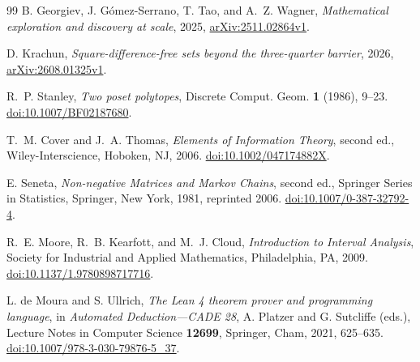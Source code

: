 \documentclass[11pt]{article}
\theoremstyle{definition}
\theoremstyle{remark}
\begin{document}
\begin{thebibliography}{99}
B. Georgiev, J. G\'omez-Serrano, T. Tao, and A.~Z. Wagner,
\emph{Mathematical exploration and discovery at scale},
2025, \href{https://arxiv.org/abs/2511.02864v1}{arXiv:2511.02864v1}.

D. Krachun,
\emph{Square-difference-free sets beyond the three-quarter barrier},
2026, \href{https://arxiv.org/abs/2608.01325v1}{arXiv:2608.01325v1}.

R.~P. Stanley,
\emph{Two poset polytopes},
Discrete Comput. Geom. \textbf{1} (1986), 9--23.
\href{https://doi.org/10.1007/BF02187680}{doi:10.1007/BF02187680}.


T.~M. Cover and J.~A. Thomas,
\emph{Elements of Information Theory}, second ed.,
Wiley-Interscience, Hoboken, NJ, 2006.
\href{https://doi.org/10.1002/047174882X}{doi:10.1002/047174882X}.


E. Seneta,
\emph{Non-negative Matrices and Markov Chains}, second ed.,
Springer Series in Statistics, Springer, New York, 1981,
reprinted 2006.
\href{https://doi.org/10.1007/0-387-32792-4}{doi:10.1007/0-387-32792-4}.


R.~E. Moore, R.~B. Kearfott, and M.~J. Cloud,
\emph{Introduction to Interval Analysis},
Society for Industrial and Applied Mathematics, Philadelphia, PA, 2009.
\href{https://doi.org/10.1137/1.9780898717716}{doi:10.1137/1.9780898717716}.


L. de Moura and S. Ullrich,
\emph{The Lean 4 theorem prover and programming language},
in \emph{Automated Deduction---CADE 28},
A. Platzer and G. Sutcliffe (eds.),
Lecture Notes in Computer Science \textbf{12699},
Springer, Cham, 2021, 625--635.
\href{https://doi.org/10.1007/978-3-030-79876-5_37}{doi:10.1007/978-3-030-79876-5\_37}.


\end{thebibliography}
\end{document}
